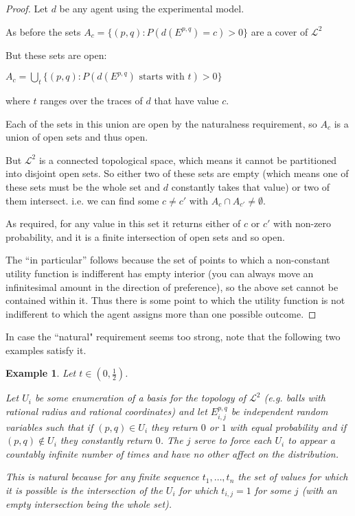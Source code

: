 \documentclass[a4paper]{book}
\newtheorem{example}{Example}
\begin{document}
\begin{proof}
Let $d$ be any agent using the experimental model. 

As before the sets
$A_c = \{(p, q): P(d(E^{p, q}) = c) > 0\}$
are a cover of $\mathcal{L}^2$

But these sets are open:

$A_c = \bigcup\limits_t \{(p, q): P(d(E^{p, q}) \text{ starts with $t$}) > 0\}$

where $t$
ranges over the traces of $d$
that have value $c$.

Each of the sets in this union are open by the naturalness requirement,
so $A_c$ is a union of open sets and thus open.

But $\mathcal{L}^2$
is a connected topological space, which means it cannot
be partitioned into disjoint open sets. So either two of these sets are empty
(which means one of these sets must be the whole set and $d$
constantly takes that value) or two of them intersect. i.e. we can find some
$c \neq c'$
with $A_c \cap A_{c'} \neq \emptyset$.

As required, for any value in this set it returns either of $c$
or $c'$
with non-zero probability, and it is a finite intersection of open sets
and so open.

The ``in particular'' follows because the set of points to which a non-constant
utility function  is indifferent has empty interior (you can always move
an infinitesimal amount in the direction of preference), so the
above set cannot be contained within it. Thus there is some point
to which the utility function is not indifferent to which the agent assigns
more than one possible outcome.
\end{proof}

In case the ``natural" requirement seems too strong, note that the following
two examples satisfy it.

\begin{example}
Let $t \in (0, \frac{1}{2})$.

Let $U_i$
be some enumeration of a basis for the topology of $\mathcal{L}^2$
(e.g. balls with rational radius and rational coordinates)
and let $E^{p, q}_{i, j}$
be independent random variables such that if $(p, q) \in U_i$
they return $0$ or $1$
with equal probability
and if $(p, q) \not\in U_i$
they constantly return $0$.
The $j$ serve to force each $U_i$ to appear a countably infinite
number of times and have no other affect on the distribution.

This is natural because for any finite sequence $t_1, \ldots, t_n$
the set of values for which it is possible is the intersection of
the $U_i$
for which $t_{i, j} = 1$
for some $j$
(with an empty intersection being the whole set).
\end{example}
\end{document}
